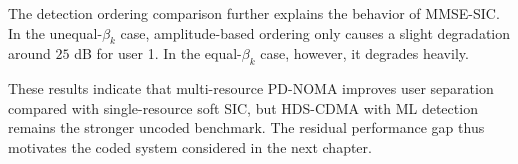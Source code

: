 The detection ordering comparison further explains the behavior of MMSE-SIC. In the unequal-$\beta_k$ case, amplitude-based ordering only causes a slight degradation around $25$ dB for user 1. In the equal-$\beta_k$ case, however, it degrades heavily.

These results indicate that multi-resource PD-NOMA improves user separation compared with single-resource soft SIC, but HDS-CDMA with ML detection remains the stronger uncoded benchmark. The residual performance gap thus motivates the coded system considered in the next chapter.


